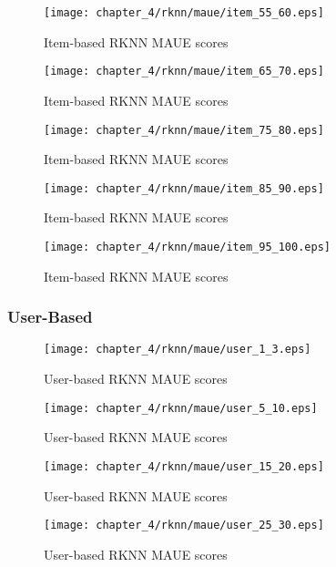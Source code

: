 \begin{figure}[H]
\centering
\texttt{[image: chapter\_4/rknn/maue/item\_55\_60.eps]}
\caption{Item-based RKNN MAUE scores}
\end{figure}

\begin{figure}[H]
\centering
\texttt{[image: chapter\_4/rknn/maue/item\_65\_70.eps]}
\caption{Item-based RKNN MAUE scores}
\end{figure}

\begin{figure}[H]
\centering
\texttt{[image: chapter\_4/rknn/maue/item\_75\_80.eps]}
\caption{Item-based RKNN MAUE scores}
\end{figure}

\begin{figure}[H]
\centering
\texttt{[image: chapter\_4/rknn/maue/item\_85\_90.eps]}
\caption{Item-based RKNN MAUE scores}
\end{figure}

\begin{figure}[H]
\centering
\texttt{[image: chapter\_4/rknn/maue/item\_95\_100.eps]}
\caption{Item-based RKNN MAUE scores}
\end{figure}

\subsubsection{User-Based}

\begin{figure}[H]
\centering
\texttt{[image: chapter\_4/rknn/maue/user\_1\_3.eps]}
\caption{User-based RKNN MAUE scores}
\end{figure}

\begin{figure}[H]
\centering
\texttt{[image: chapter\_4/rknn/maue/user\_5\_10.eps]}
\caption{User-based RKNN MAUE scores}
\end{figure}

\begin{figure}[H]
\centering
\texttt{[image: chapter\_4/rknn/maue/user\_15\_20.eps]}
\caption{User-based RKNN MAUE scores}
\end{figure}

\begin{figure}[H]
\centering
\texttt{[image: chapter\_4/rknn/maue/user\_25\_30.eps]}
\caption{User-based RKNN MAUE scores}
\end{figure}

